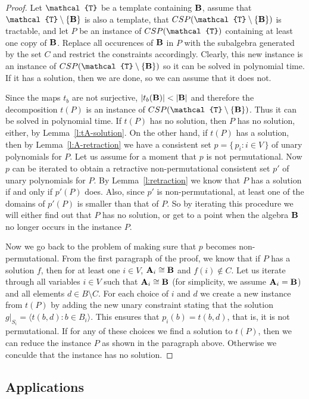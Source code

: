 \documentclass[11pt]{amsart}
\newcommand{\m}[1]{{\uppercase {\mathbf {#1}}}}
\newcommand{\vr}[1]{{\uppercase {\mathcal{#1}}}}
\newcommand{\lb}{\langle}
\newcommand{\rb}{\rangle}
\theoremstyle{definition}
\begin{document}
\begin{proof}
Let $\vr t$ be a template containing $\m B$, assume that $\vr t\setminus \{\m b\}$ is also a template, that $CSP(\vr t\setminus \{\m b\})$ is tractable, and let $P$ be an instance of $CSP(\vr t)$ containing at least one copy of $\m B$. Replace all occurences of $\m B$ in $P$ with the subalgebra generated by the set $C$ and restrict the constraints accordingly. Clearly, this new instance is an instance of $CSP(\vr t\setminus\{\m B\})$ so it can be solved in polynomial time. If it has a solution, then we are done, so we can assume that it does not.

Since the maps $t_b$ are not surjective, $|t_b(\m b)|<|\m B|$ and therefore the decomposition $t(P)$ is an instance of $CSP(\vr t\setminus\{\m B\})$. Thus it can be solved in polynomial time. If $t(P)$ has no solution, then $P$ has no solution, either, by Lemma~\ref{l:tA-solution}. On the other hand, if $t(P)$ has a solution, then by Lemma~\ref{l:A-retraction} we have a consistent set $p = \{\, p_i : i\in V \,\}$ of unary polynomials for $P$. Let us assume for a moment that $p$ is not permutational. Now $p$ can be iterated to obtain a retractive non-permutational consistent set $p'$ of unary polynomials for $P$. By Lemma~\ref{l:retraction} we know that $P$ has a solution if and only if $p'(P)$ does. Also, since $p'$ is non-permutational, at least one of the domains of $p'(P)$ is smaller than that of $P$. So by iterating this procedure we will either find out that $P$ has no solution, or get to a point when the algebra $\m B$ no longer occurs in the instance $P$.

Now we go back to the problem of making sure that $p$ becomes non-permutational. From the first paragraph of the proof, we know that if $P$ has a solution $f$, then for at least one $i\in V$, $\m a_i\cong\m B$ and $f(i)\not\in C$. Let us iterate through all variables $i\in V$ such that $\m a_i\cong \m B$ (for simplicity, we assume $\m A_i=\m B$) and all elements $d\in B\setminus C$. For each choice of $i$ and $d$ we create a new instance from $t(P)$ by adding the new unary constraint stating that the solution $g|_{S_i} = \lb t(b,d) : b\in B_i \rb$. This ensures that $p_i(b) = t(b,d)$, that is, it is not permutational. If for any of these choices we find a solution to $t(P)$, then we can reduce the instance $P$ as shown in the paragraph above. Otherwise we conculde that the instance has no solution.
\end{proof}

\subsection{Applications}
\end{document}
